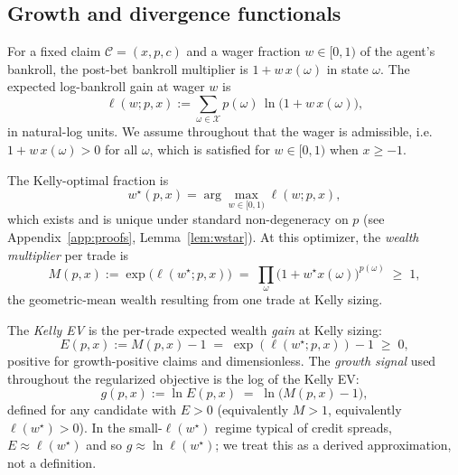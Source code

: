 \documentclass[11pt]{article}
\theoremstyle{definition}
\theoremstyle{remark}
\newcommand{\C}{\mathcal{C}}
\newcommand{\G}{g}
\newcommand{\X}{\mathcal{X}}
\begin{document}
\subsection{Growth and divergence functionals}

For a fixed claim $\C = (x, p, c)$ and a wager fraction $w \in [0, 1)$
of the agent's bankroll, the post-bet bankroll multiplier is
$1 + w \, x(\omega)$ in state $\omega$. The expected log-bankroll
gain at wager $w$ is
\begin{equation}
\ell(w; p, x) := \sum_{\omega \in \X} p(\omega) \, \ln\bigl(1 + w \, x(\omega)\bigr),
\label{eq:loggrowth}
\end{equation}
in natural-log units. We assume throughout that the wager is
admissible, i.e.\ $1 + w \, x(\omega) > 0$ for all $\omega$, which is
satisfied for $w \in [0, 1)$ when $x \ge -1$.

The Kelly-optimal fraction is
\begin{equation}
w^\star(p, x) = \arg\max_{w \in [0, 1)} \ell(w; p, x),
\label{eq:wstar}
\end{equation}
which exists and is unique under standard non-degeneracy on $p$ (see
Appendix~\ref{app:proofs}, Lemma~\ref{lem:wstar}). At this optimizer,
the \emph{wealth multiplier} per trade is
\begin{equation}
M(p, x) := \exp\!\bigl(\ell(w^\star; p, x)\bigr)
        \;=\; \prod_{\omega} \bigl(1 + w^\star x(\omega)\bigr)^{p(\omega)}
        \;\ge\; 1,
\label{eq:M}
\end{equation}
the geometric-mean wealth resulting from one trade at Kelly sizing.

The \emph{Kelly EV} is the per-trade expected wealth \emph{gain} at
Kelly sizing:
\begin{equation}
E(p, x) := M(p, x) - 1 \;=\; \exp(\ell(w^\star; p, x)) - 1 \;\ge\; 0,
\label{eq:E}
\end{equation}
positive for growth-positive claims and dimensionless. The
\emph{growth signal} used throughout the regularized objective is the
log of the Kelly EV:
\begin{equation}
\G(p, x) := \ln E(p, x) \;=\; \ln\!\bigl(M(p, x) - 1\bigr),
\label{eq:g}
\end{equation}
defined for any candidate with $E > 0$ (equivalently $M > 1$,
equivalently $\ell(w^\star) > 0$). In the small-$\ell(w^\star)$ regime
typical of credit spreads, $E \approx \ell(w^\star)$ and so
$\G \approx \ln \ell(w^\star)$; we treat this as a derived
approximation, not a definition.
\end{document}
